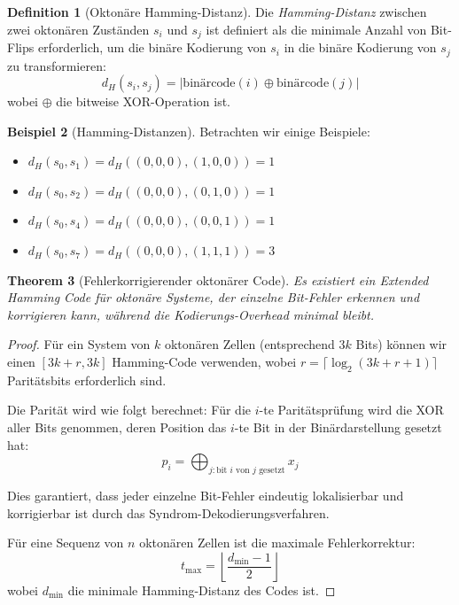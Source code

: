 \documentclass[12pt, a4paper]{article}
\newtheorem{theorem}{Theorem}[section]
\theoremstyle{definition}
\newtheorem{definition}[theorem]{Definition}
\newtheorem{example}[theorem]{Beispiel}
\theoremstyle{remark}
\begin{document}
\begin{definition}[Oktonäre Hamming-Distanz]
\label{def:hamming_oktonaer}
Die \emph{Hamming-Distanz} zwischen zwei oktonären Zuständen $s_i$ und $s_j$ ist definiert als die minimale Anzahl von Bit-Flips erforderlich, um die binäre Kodierung von $s_i$ in die binäre Kodierung von $s_j$ zu transformieren:
\[
d_H(s_i, s_j) = |\text{binärcode}(i) \oplus \text{binärcode}(j)|
\]
wobei $\oplus$ die bitweise XOR-Operation ist.
\end{definition}

\begin{example}[Hamming-Distanzen]
Betrachten wir einige Beispiele:
\begin{itemize}
  \item $d_H(s_0, s_1) = d_H((0,0,0), (1,0,0)) = 1$
  \item $d_H(s_0, s_2) = d_H((0,0,0), (0,1,0)) = 1$
  \item $d_H(s_0, s_4) = d_H((0,0,0), (0,0,1)) = 1$
  \item $d_H(s_0, s_7) = d_H((0,0,0), (1,1,1)) = 3$
\end{itemize}
\end{example}

\begin{theorem}[Fehlerkorrigierender oktonärer Code]
\label{thm:fehlerkorrigierender_code_oktonaer}
Es existiert ein \emph{Extended Hamming Code} für oktonäre Systeme, der einzelne Bit-Fehler erkennen und korrigieren kann, während die Kodierungs-Overhead minimal bleibt.
\end{theorem}

\begin{proof}
Für ein System von $k$ oktonären Zellen (entsprechend $3k$ Bits) können wir einen $[3k+r, 3k]$ Hamming-Code verwenden, wobei $r = \lceil \log_2(3k + r + 1) \rceil$ Paritätsbits erforderlich sind.

Die Parität wird wie folgt berechnet: Für die $i$-te Paritätsprüfung wird die XOR aller Bits genommen, deren Position das $i$-te Bit in der Binärdarstellung gesetzt hat:
\[
p_i = \bigoplus_{j: \text{bit } i \text{ von } j \text{ gesetzt}} x_j
\]

Dies garantiert, dass jeder einzelne Bit-Fehler eindeutig lokalisierbar und korrigierbar ist durch das Syndrom-Dekodierungsverfahren.

Für eine Sequenz von $n$ oktonären Zellen ist die maximale Fehlerkorrektur:
\[
t_{\max} = \left\lfloor \frac{d_{\min} - 1}{2} \right\rfloor
\]
wobei $d_{\min}$ die minimale Hamming-Distanz des Codes ist.
\end{proof}
\end{document}
